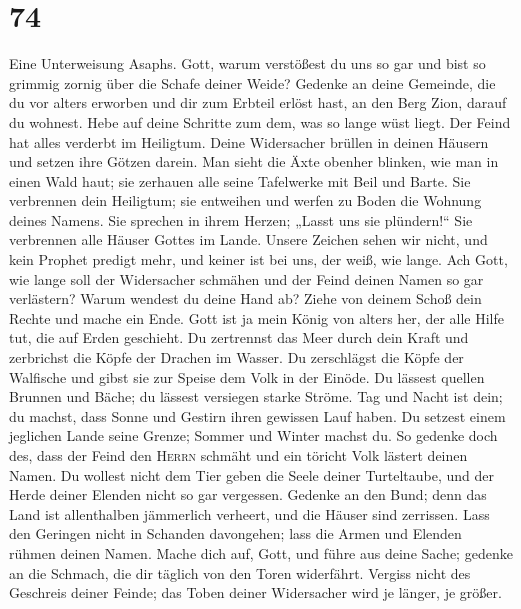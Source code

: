 \hypertarget{section-73}{%
\section{74}\label{section-73}}

 Eine Unterweisung Asaphs. Gott, warum verstößest du uns
so gar und bist so grimmig zornig über die Schafe deiner Weide?
 Gedenke an deine Gemeinde, die du vor alters erworben und
dir zum Erbteil erlöst hast, an den Berg Zion, darauf du wohnest.
 Hebe auf deine Schritte zum dem, was so lange wüst liegt.
Der Feind hat alles verderbt im Heiligtum.  Deine
Widersacher brüllen in deinen Häusern und setzen ihre Götzen darein.
 Man sieht die Äxte obenher blinken, wie man in einen Wald
haut;  sie zerhauen alle seine Tafelwerke mit Beil und
Barte.  Sie verbrennen dein Heiligtum; sie entweihen und
werfen zu Boden die Wohnung deines Namens.  Sie sprechen
in ihrem Herzen; „Lasst uns sie plündern!{}`` Sie verbrennen alle Häuser
Gottes im Lande.  Unsere Zeichen sehen wir nicht, und kein
Prophet predigt mehr, und keiner ist bei uns, der weiß, wie lange.
 Ach Gott, wie lange soll der Widersacher schmähen und
der Feind deinen Namen so gar verlästern?  Warum wendest
du deine Hand ab? Ziehe von deinem Schoß dein Rechte und mache ein Ende.
 Gott ist ja mein König von alters her, der alle Hilfe
tut, die auf Erden geschieht.  Du zertrennst das Meer
durch dein Kraft und zerbrichst die Köpfe der Drachen im Wasser.
 Du zerschlägst die Köpfe der Walfische und gibst sie zur
Speise dem Volk in der Einöde.  Du lässest quellen
Brunnen und Bäche; du lässest versiegen starke Ströme. 
Tag und Nacht ist dein; du machst, dass Sonne und Gestirn ihren gewissen
Lauf haben.  Du setzest einem jeglichen Lande seine
Grenze; Sommer und Winter machst du.  So gedenke doch
des, dass der Feind den \textsc{Herrn} schmäht und ein töricht Volk
lästert deinen Namen.  Du wollest nicht dem Tier geben
die Seele deiner Turteltaube, und der Herde deiner Elenden nicht so gar
vergessen.  Gedenke an den Bund; denn das Land ist
allenthalben jämmerlich verheert, und die Häuser sind zerrissen.
 Lass den Geringen nicht in Schanden davongehen; lass die
Armen und Elenden rühmen deinen Namen.  Mache dich auf,
Gott, und führe aus deine Sache; gedenke an die Schmach, die dir täglich
von den Toren widerfährt.  Vergiss nicht des Geschreis
deiner Feinde; das Toben deiner Widersacher wird je länger, je größer.

